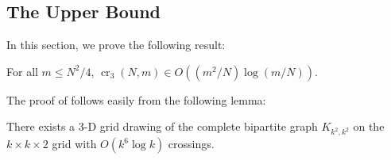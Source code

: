 \documentclass{patmorin}
\newcommand{\n}{N}
\DeclareMathOperator{\crs}{cr}
\begin{document}
%

\subsection{The Upper Bound}

In this section, we prove the following result:

\begin{thm}
  For all $m\le\n^2/4$, $\crs_3(\n,m) \in O((m^2/\n)\log (m/\n))$.
\end{thm}

The proof of  follows easily from the following
lemma:
\begin{lem}
  There exists a 3-D grid drawing of the complete bipartite graph
  $K_{k^2,k^2}$ on the $k\times k\times 2$ grid with $O(k^6\log k)$
  crossings.
\end{lem}
\end{document}
